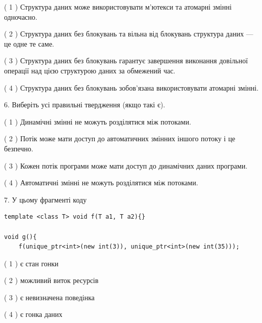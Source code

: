 \documentclass[12pt, ukrainian]{article}
\begin{document}
\begin {large}
{( 1 ) Структура даних може використовувати м’ютекси та атомарні змінні одночасно.%

( 2 ) Структура даних без блокувань та вільна від блокувань структура даних --- це одне те саме.%

( 3 ) Структура даних без блокувань гарантує завершення виконання довільної операції над цією структурою даних за обмежений час.%

( 4 ) Структура даних без блокувань зобов’язана використовувати атомарні змінні.%
\newpage



\vspace{5mm}
6. Виберіть усі правильні твердження (якщо такі є).\par
\vspace{2mm}

( 1 ) Динамічні змінні не можуть розділятися між потоками.%

( 2 ) Потік може мати доступ до автоматичних змінних іншого потоку і це безпечно.%

( 3 ) Кожен потік програми може мати доступ до динамічних даних програми.%

( 4 ) Автоматичні змінні не можуть розділятися між потоками.%


\vspace{5mm}
7. У цьому фрагменті коду
\begin{verbatim}
template <class T> void f(T a1, T a2){}

void g(){
    f(unique_ptr<int>(new int(3)), unique_ptr<int>(new int(35)));
\end{verbatim}

( 1 ) є стан гонки%

( 2 ) можливий виток ресурсів%

( 3 ) є невизначена поведінка%

( 4 ) є гонка даних%
}
\end {large}
\end{document}
